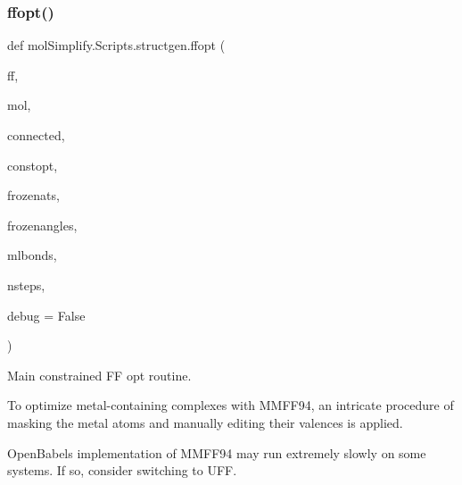 \subsubsection{\texorpdfstring{ffopt()}{ffopt()}}
{\footnotesize\ttfamily def mol\+Simplify.\+Scripts.\+structgen.\+ffopt (\begin{DoxyParamCaption}\item[{}]{ff,  }\item[{}]{mol,  }\item[{}]{connected,  }\item[{}]{constopt,  }\item[{}]{frozenats,  }\item[{}]{frozenangles,  }\item[{}]{mlbonds,  }\item[{}]{nsteps,  }\item[{}]{debug = {\ttfamily False} }\end{DoxyParamCaption})}



Main constrained FF opt routine. 

To optimize metal-\/containing complexes with M\+M\+F\+F94, an intricate procedure of masking the metal atoms and manually editing their valences is applied.

Open\+Babel\textquotesingle{}s implementation of M\+M\+F\+F94 may run extremely slowly on some systems. If so, consider switching to U\+FF.


